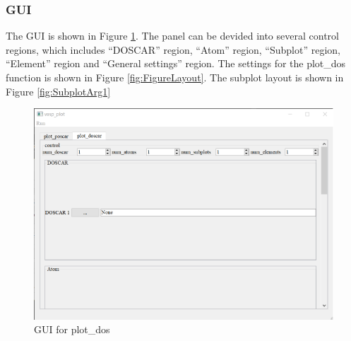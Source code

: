 \documentclass[12pt]{book}
\begin{document}
\subsubsection{GUI}

The GUI is shown in Figure \ref{fig:gui_plot_dos}. The panel can be devided into several control regions, which includes ``DOSCAR'' region, ``Atom'' region, ``Subplot'' region, ``Element'' region and ``General settings'' region.
The settings for the plot\_dos function is shown in Figure \ref{fig:FigureLayout}. The subplot layout is shown in Figure \ref{fig:SubplotArg1}

\begin{figure}[htbp]
\centering
\includegraphics[width=1.1\textwidth]{gui_plot_dos.pdf}
\caption{GUI for plot\_dos}
\label{fig:gui_plot_dos}
\end{figure}

\end{document}
